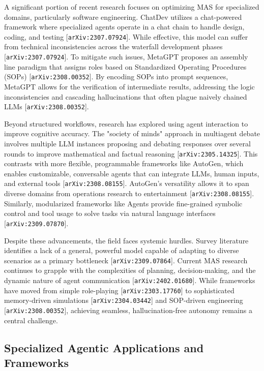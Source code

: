\documentclass[11pt]{article}
\begin{document}
A significant portion of recent research focuses on optimizing MAS for specialized domains, particularly software engineering. ChatDev utilizes a chat-powered framework where specialized agents operate in a chat chain to handle design, coding, and testing [\texttt{arXiv:2307.07924}]. While effective, this model can suffer from technical inconsistencies across the waterfall development phases [\texttt{arXiv:2307.07924}]. To mitigate such issues, MetaGPT proposes an assembly line paradigm that assigns roles based on Standardized Operating Procedures (SOPs) [\texttt{arXiv:2308.00352}]. By encoding SOPs into prompt sequences, MetaGPT allows for the verification of intermediate results, addressing the logic inconsistencies and cascading hallucinations that often plague naively chained LLMs [\texttt{arXiv:2308.00352}].

Beyond structured workflows, research has explored using agent interaction to improve cognitive accuracy. The "society of minds" approach in multiagent debate involves multiple LLM instances proposing and debating responses over several rounds to improve mathematical and factual reasoning [\texttt{arXiv:2305.14325}]. This contrasts with more flexible, programmable frameworks like AutoGen, which enables customizable, conversable agents that can integrate LLMs, human inputs, and external tools [\texttt{arXiv:2308.08155}]. AutoGen's versatility allows it to span diverse domains from operations research to entertainment [\texttt{arXiv:2308.08155}]. Similarly, modularized frameworks like Agents provide fine-grained symbolic control and tool usage to solve tasks via natural language interfaces [\texttt{arXiv:2309.07870}].

Despite these advancements, the field faces systemic hurdles. Survey literature identifies a lack of a general, powerful model capable of adapting to diverse scenarios as a primary bottleneck [\texttt{arXiv:2309.07864}]. Current MAS research continues to grapple with the complexities of planning, decision-making, and the dynamic nature of agent communication [\texttt{arXiv:2402.01680}]. While frameworks have moved from simple role-playing [\texttt{arXiv:2303.17760}] to sophisticated memory-driven simulations [\texttt{arXiv:2304.03442}] and SOP-driven engineering [\texttt{arXiv:2308.00352}], achieving seamless, hallucination-free autonomy remains a central challenge.

\subsection{Specialized Agentic Applications and Frameworks}
\end{document}
